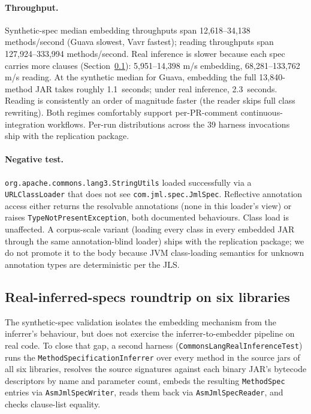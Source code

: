 \paragraph{Throughput.}
Synthetic-spec median embedding throughputs span 12{,}618--34{,}138 methods/second (Guava slowest, Vavr fastest); reading throughputs span 127{,}924--333{,}994 methods/second. Real inference is slower because each spec carries more clauses (Section~\ref{subsec:real-inference}): 5{,}951--14{,}398 m/s embedding, 68{,}281--133{,}762 m/s reading. At the synthetic median for Guava, embedding the full 13{,}840-method JAR takes roughly 1.1~seconds; under real inference, 2.3~seconds. Reading is consistently an order of magnitude faster (the reader skips full class rewriting). Both regimes comfortably support per-PR-comment continuous-integration workflows. Per-run distributions across the 39 harness invocations ship with the replication package.

\paragraph{Negative test.}
\texttt{org.apache.\allowbreak{}commons.\allowbreak{}lang3.\allowbreak{}StringUtils} loaded successfully via a \texttt{URLClassLoader} that does not see \texttt{com.jml.spec.JmlSpec}. Reflective annotation access either returns the resolvable annotations (none in this loader's view) or raises \texttt{TypeNotPresentException}, both documented behaviours. Class load is unaffected. A corpus-scale variant (loading every class in every embedded JAR through the same annotation-blind loader) ships with the replication package; we do not promote it to the body because JVM class-loading semantics for unknown annotation types are deterministic per the JLS.

\subsection{Real-inferred-specs roundtrip on six libraries}
\label{subsec:real-inference}

The synthetic-spec validation isolates the embedding mechanism from the inferrer's behaviour, but does not exercise the inferrer-to-embedder pipeline on real code. To close that gap, a second harness (\texttt{CommonsLangRealInferenceTest}) runs the \texttt{MethodSpecificationInferrer} over every method in the source jars of all six libraries, resolves the source signatures against each binary JAR's bytecode descriptors by name and parameter count, embeds the resulting \texttt{MethodSpec} entries via \texttt{AsmJmlSpecWriter}, reads them back via \texttt{AsmJmlSpecReader}, and checks clause-list equality.

